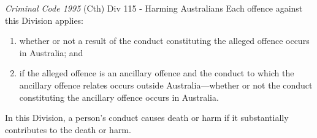 \begin{statutedetails}{\textit{Criminal Code 1995} (Cth) Div 115 - Harming Australians}
    Each offence against this Division applies:
    \begin{enumerate}[label=(\alph*)]
        \item whether or not a result of the conduct constituting the alleged offence occurs in Australia; and
        \item if the alleged offence is an ancillary offence and the conduct to which the ancillary offence relates occurs outside Australia—whether or not the conduct constituting the ancillary offence occurs in Australia.
    \end{enumerate}

    In this Division, a person's conduct causes death or harm if it substantially contributes to the death or harm.
\end{statutedetails}

